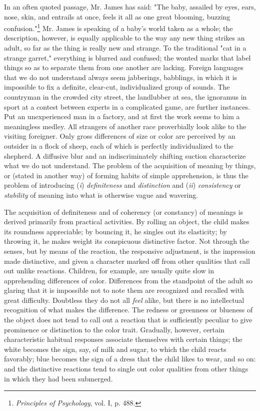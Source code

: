 \documentclass[letterpaper]{book}
\begin{document}
In an often quoted passage, Mr. James has said: "The baby, assailed by
eyes, ears, nose, skin, and entrails at once, feels it all as one great
blooming, buzzing
confusion."\footnote{
\emph{Principles of Psychology}, vol. I, p. 488.
}
Mr. James is speaking of a baby's world taken as a whole; the
description, however, is equally applicable to the way any new thing
strikes an adult, so far as the thing is really new and strange. To the
traditional "cat in a strange garret," everything is blurred and
confused; the wonted marks that label things so as to separate them from
one another are lacking. Foreign languages that we do not understand
always seem jabberings, babblings, in which it is impossible to fix a
definite, clear-cut, individualized group of sounds. The countryman in
the crowded city street, the landlubber at sea, the ignoramus in sport
at a contest between experts in a complicated game, are further
instances. Put an unexperienced man in a factory, and at first the work
seems to him a meaningless medley. All strangers of another race
proverbially look alike to the
visiting
foreigner. Only gross differences of size or color are perceived by an
outsider in a flock of sheep, each of which is perfectly individualized
to the shepherd. A diffusive blur and an indiscriminately shifting
suction characterize what we do not understand. The problem of the
acquisition of meaning by things, or (stated in another way) of forming
habits of simple apprehension, is thus the problem of introducing
(\emph{i}) \emph{definiteness} and \emph{distinction} and (\emph{ii})
\emph{consistency} or \emph{stability} of meaning into what is otherwise
vague and wavering.


The acquisition of definiteness and of coherency (or constancy) of
meanings is derived primarily from practical activities. By rolling an
object, the child makes its roundness appreciable; by bouncing it, he
singles out its elasticity; by throwing it, he makes weight its
conspicuous distinctive factor. Not through the senses, but by means of
the reaction, the responsive adjustment, is the impression made
distinctive, and given a character marked off from other qualities that
call out unlike reactions. Children, for example, are usually quite slow
in apprehending differences of color. Differences from the standpoint of
the adult so glaring that it is impossible not to note them are
recognized and recalled with great difficulty. Doubtless they do not all
\emph{feel} alike, but there is no intellectual recognition of what
makes the difference. The redness or greenness or blueness of the object
does not tend to call out a reaction that is sufficiently peculiar to
give prominence or distinction to the color trait. Gradually, however,
certain characteristic habitual responses associate themselves with
certain things; the white becomes the sign, say, of milk and sugar, to
which the child reacts favorably; blue becomes the sign of a dress that
the child likes to wear, and so on: and
the
distinctive reactions tend to single out color qualities from other
things in which they had been submerged.
\end{document}
